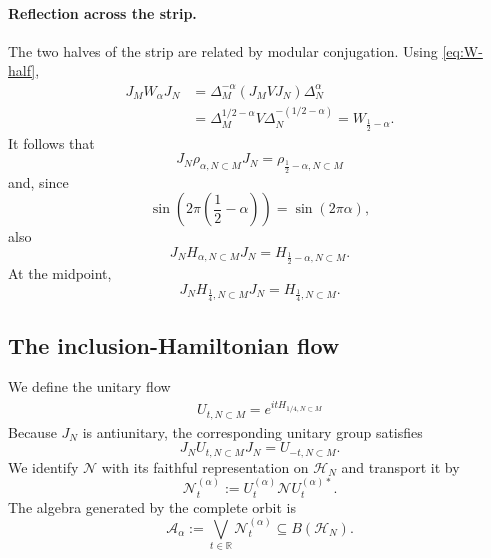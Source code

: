 \documentclass[a4paper,11pt]{article}
\theoremstyle{definition}
\begin{document}
\paragraph{Reflection across the strip.}
The two halves of the strip are related by modular conjugation. Using
\eqref{eq:W-half},
\begin{align}
    J_MW_\alpha J_N
    &=
    \Delta_M^{-\alpha}
    (J_MVJ_N)
    \Delta_N^\alpha
    \nonumber\\
    &=
    \Delta_M^{1/2-\alpha}
    V
    \Delta_N^{-(1/2-\alpha)}
    =
    W_{\frac12-\alpha}.
    \label{eq:W-reflection}
\end{align}
It follows that
\begin{equation}
    \boxed{
    J_N
    \rho_{\alpha,N\subset M}
    J_N
    =
    \rho_{\frac12-\alpha,N\subset M}
    }
    \label{eq:rho-reflection}
\end{equation}
and, since
\begin{equation}
    \sin\left(2\pi\left(\frac12-\alpha\right)\right)
    =
    \sin(2\pi\alpha),
\end{equation}
also
\begin{equation}
    \boxed{
    J_N
    H_{\alpha,N\subset M}
    J_N
    =
    H_{\frac12-\alpha,N\subset M}.
    }
    \label{eq:H-reflection}
\end{equation}
At the midpoint,
\begin{equation}
    J_N
    H_{\frac14,N\subset M}
    J_N
    =
    H_{\frac14,N\subset M}.
    \label{eq:H-quarter-real}
\end{equation}

\subsection{The inclusion-Hamiltonian flow}

We define the unitary flow 
\begin{align}
    U_{t,N\subset M}=e^{i t H_{1/4,N\subset M}}
\end{align}
Because $J_N$ is antiunitary, the corresponding unitary group satisfies
\begin{equation}
    J_N
    U_{t,N\subset M}
    J_N
    =
    U_{-t,N\subset M}.
    \label{eq:H-quarter-time-reversal}
\end{equation}
We identify $\mathcal N$ with its faithful representation on
$\mathcal H_N$ and transport it by
\begin{equation}
    \mathcal N_t^{(\alpha)}
    :=
    U_t^{(\alpha)}
    \mathcal N
    U_t^{(\alpha)*}.
    \label{eq:N-alpha-t-general}
\end{equation}
The algebra generated by the complete orbit is
\begin{equation}
    \mathcal A_\alpha
    :=
    \bigvee_{t\in\mathbb R}
    \mathcal N_t^{(\alpha)}
    \subseteq B(\mathcal H_N).
    \label{eq:A-alpha-general}
\end{equation}
\end{document}
